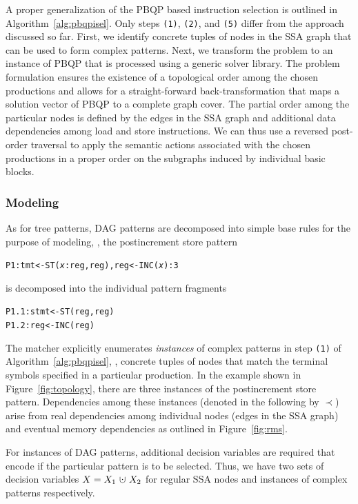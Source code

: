 A proper generalization of the PBQP based instruction selection
\cite{Ebner08} is outlined in Algorithm~\ref{alg:pbqpisel}. Only steps
\texttt{(1)}, \texttt{(2)}, and \texttt{(5)} differ from the approach
discussed so far. First, we identify concrete tuples of nodes in the
SSA graph that can be used to form complex patterns. Next, we
transform the problem to an instance of PBQP that is processed using a
generic solver library. The problem formulation ensures the existence
of a topological order among the chosen productions and allows for a
straight-forward back-transformation that maps a solution vector of
PBQP to a complete graph cover. The partial order among the particular
nodes is defined by the edges in the SSA graph and additional data
dependencies among load and store instructions.  We can thus use a
reversed post-order traversal to apply the semantic actions associated
with the chosen productions in a proper order on the subgraphs induced
by individual basic blocks.

\subsubsection{Modeling}
As for tree patterns, DAG patterns are decomposed into simple base
rules for the purpose of modeling, \eg, the postincrement store
pattern
\begin{alltt}
  P1: tmt <- ST(\textit{x}:reg, reg), reg <- INC(\textit{x}) : 3
\end{alltt}
is decomposed into the individual pattern fragments
\begin{alltt}
  P1.1: stmt <- ST(reg, reg)
  P1.2: reg  <- INC(reg)
\end{alltt}
The matcher explicitly enumerates \emph{instances\/} of complex
patterns in step \texttt{(1)} of Algorithm~\ref{alg:pbqpisel}, \ie,
concrete tuples of nodes that match the terminal symbols specified in
a particular production. In the example shown in
Figure~\ref{fig:topology}, there are three instances of the
postincrement store pattern. Dependencies among these instances
(denoted in the following by $\prec$) arise from real dependencies
among individual nodes (edges in the SSA graph) and eventual memory
dependencies as outlined in Figure~\ref{fig:rms}.

For instances of DAG patterns, additional decision variables are
required that encode if the particular pattern is to be
selected. Thus, we have two sets of decision variables
$X=X_1~\dotcup~X_2$ for regular SSA nodes and instances of complex
patterns respectively.

